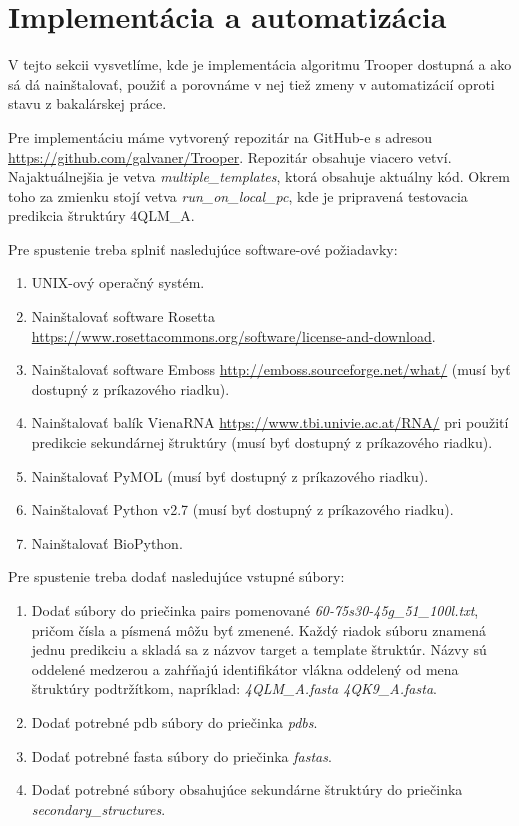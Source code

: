 \section{Implementácia a automatizácia}
V tejto sekcii vysvetlíme, kde je implementácia algoritmu Trooper dostupná a ako sá dá nainštalovať, použiť a porovnáme v nej tiež zmeny v automatizácií oproti stavu z bakalárskej práce.


\indent Pre implementáciu máme vytvorený repozitár na GitHub-e s adresou \url{https://github.com/galvaner/Trooper}. Repozitár obsahuje viacero vetví. 
Najaktuálnejšia je vetva \textit{multiple\_templates}, ktorá obsahuje aktuálny kód. Okrem toho za zmienku stojí vetva \textit{run\_on\_local\_pc}, kde je pripravená testovacia predikcia štruktúry 4QLM\_A.


\indent Pre spustenie treba splniť nasledujúce software-ové požiadavky:
\begin{enumerate}
\item UNIX-ový operačný systém.
\item Nainštalovať software Rosetta \url{https://www.rosettacommons.org/software/license-and-download}.
\item Nainštalovať software Emboss \url{http://emboss.sourceforge.net/what/} (musí byť dostupný z príkazového riadku).
\item Nainštalovať balík VienaRNA \url{https://www.tbi.univie.ac.at/RNA/} pri použití predikcie sekundárnej štruktúry (musí byť dostupný z príkazového riadku).
\item Nainštalovať PyMOL (musí byť dostupný z príkazového riadku).
\item Nainštalovať Python v2.7 (musí byť dostupný z príkazového riadku).
\item Nainštalovať BioPython.
\end{enumerate}


\indent Pre spustenie treba dodať nasledujúce vstupné súbory:
\begin{enumerate}
\item Dodať súbory do priečinka pairs pomenované \textit{60-75s30-45g\_51\_100l.txt}, pričom čísla a písmená môžu byť zmenené. Každý riadok súboru znamená jednu predikciu a skladá sa z názvov target a template štruktúr. Názvy sú oddelené medzerou a zahŕňajú identifikátor vlákna oddelený od mena štruktúry podtržítkom, napríklad: \textit{4QLM\_A.fasta 4QK9\_A.fasta}.
\item Dodať potrebné pdb súbory do priečinka \textit{pdbs}. 
\item Dodať potrebné fasta súbory do priečinka \textit{fastas}.
\item Dodať potrebné súbory obsahujúce sekundárne štruktúry do priečinka \textit{secondary\_structures}.
\end{enumerate}


